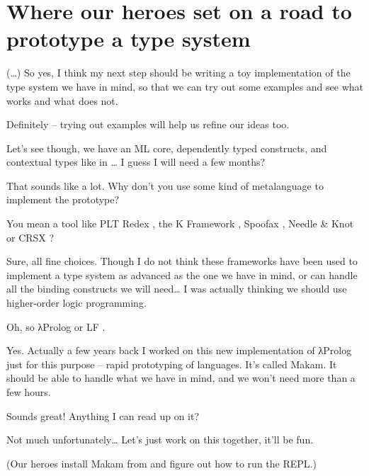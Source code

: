 \section{Where our heroes set on a road to prototype a type
system}\label{where-our-heroes-set-on-a-road-to-prototype-a-type-system}

\heroSTUDENT{} (\ldots{}) So yes, I think my next step should be writing a toy
implementation of the type system we have in mind, so that we can try
out some examples and see what works and what does not.

\heroADVISOR{} Definitely -- trying out examples will help us refine our ideas
too.

\heroSTUDENT{} Let's see though, we have an ML core, dependently typed
constructs, and contextual types like in
\citet{nanevski2008contextual}\ldots{} I guess I will need a few months?

\heroADVISOR{} That sounds like a lot. Why don't you use some kind of
metalanguage to implement the prototype?

\heroSTUDENT{} You mean a tool like PLT Redex \citep{felleisen2009semantics},
the K Framework \citep{rosu2010overview,ellison2009rewriting}, Spoofax
\citep{kats2010spoofax}, Needle \& Knot \citep{keuchel2016needle} or
CRSX \citep{rose2011crsx}?

\heroADVISOR{} Sure, all fine choices. Though I do not think these frameworks
have been used to implement a type system as advanced as the one we have
in mind, or can handle all the binding constructs we will need\ldots{} I
was actually thinking we should use higher-order logic programming.

\heroSTUDENT{} Oh, so \foreignlanguage{greek}{λ}Prolog \citep{miller1988overview} or LF
\citep{pfenning1999system}.

\heroADVISOR{} Yes. Actually a few years back I worked on this new
implementation of \foreignlanguage{greek}{λ}Prolog just for this purpose -- rapid prototyping of
languages. It's called Makam. It should be able to handle what we have
in mind, and we won't need more than a few hours.

\heroSTUDENT{} Sounds great! Anything I can read up on it?

\heroADVISOR{} Not much unfortunately\ldots{} Let's just work on this
together, it'll be fun.

\begin{scenecomment}
(Our heroes install Makam from
\fi\xspace
and figure out how to run the REPL.)
\end{scenecomment}
